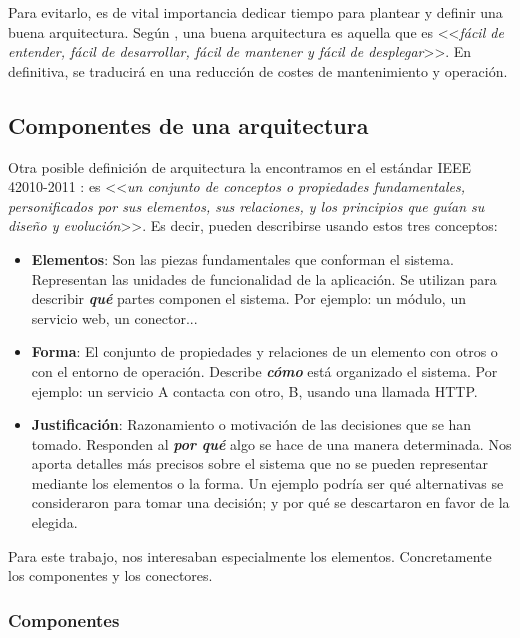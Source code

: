 Para evitarlo, es de vital importancia dedicar tiempo para plantear y definir una buena arquitectura. Según \cite{martinChapter15What2018}, una buena arquitectura es aquella que es <<\emph{fácil de entender, fácil de desarrollar, fácil de mantener y fácil de desplegar}>>. En definitiva, se traducirá en una reducción de costes de mantenimiento y operación.

\subsection{Componentes de una arquitectura}

Otra posible definición de arquitectura la encontramos en el estándar IEEE 42010-2011 \cite{ieeeStandard420102011Systems2011}: es <<\emph{un conjunto de conceptos o propiedades fundamentales, personificados por sus elementos, sus relaciones, y los principios que guían su diseño y evolución}>>. Es decir, pueden describirse usando estos tres conceptos: \cite{perryFoundationsStudySoftware1992}

    \begin{itemize}
        \item \textbf{Elementos}: Son las piezas fundamentales que conforman el sistema. Representan las unidades de funcionalidad de la aplicación. Se utilizan para describir \textbf{\emph{qué}} partes componen el sistema. Por ejemplo: un módulo, un servicio web, un conector...

        \item \textbf{Forma}: El conjunto de propiedades y relaciones de un elemento con otros o con el entorno de operación. Describe \textbf{\emph{cómo}} está organizado el sistema. Por ejemplo: un servicio A contacta con otro, B, usando una llamada HTTP.

        \item \textbf{Justificación}: Razonamiento o motivación de las decisiones que se han tomado. Responden al \textbf{\emph{por qué}} algo se hace de una manera determinada. Nos aporta detalles más precisos sobre el sistema que no se pueden representar mediante los elementos o la forma. Un ejemplo podría ser qué alternativas se consideraron para tomar una decisión; y por qué se descartaron en favor de la elegida.

    \end{itemize}

Para este trabajo, nos interesaban especialmente los elementos. Concretamente los componentes y los conectores.

\subsubsection{Componentes}

